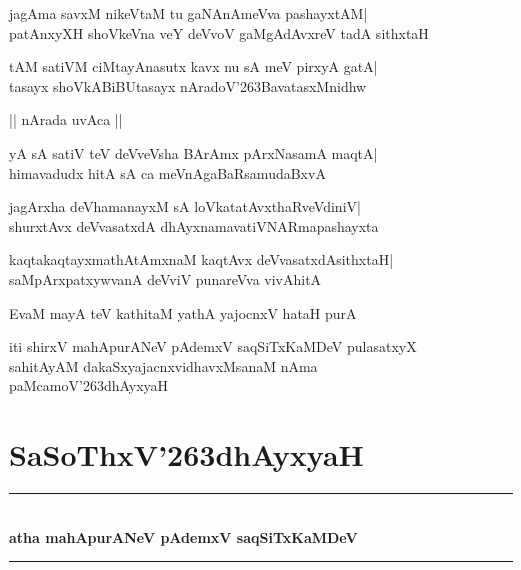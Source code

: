 \documentclass[twoside,12pt,openright]{book}
\def\S{\char'263}
\newcounter{shloka}[chapter]
\begin{document}
\begin{shloka}%
jagAma savxM nikeVtaM tu gaNAnAmeVva pashayxtAM|\\
patAnxyXH shoVkeVna veY deVvoV gaMgAdAvxreV tadA sithxtaH
\end{shloka}

\begin{shloka}%
tAM satiVM ciMtayAnasutx kavx nu sA meV pirxyA gatA|\\
tasayx shoVkABiBUtasayx nAradoV\S BavatasxMnidhw
\end{shloka}

\begin{center}
|| nArada uvAca ||
\end{center}
\begin{shloka}%
yA sA satiV teV deVveVsha BArAmx pArxNasamA maqtA|\\
himavadudx hitA sA ca meVnAgaBaRsamudaBxvA
\end{shloka}

\begin{shloka}%
jagArxha deVhamanayxM sA loVkatatAvxthaRveVdiniV|\\
shurxtAvx deVvasatxdA dhAyxnamavatiVNARmapashayxta
\end{shloka}

\begin{shloka}%
kaqtakaqtayxmathAtAmxnaM kaqtAvx deVvasatxdAsithxtaH|\\
saMpArxpatxywvanA deVviV punareVva vivAhitA
\end{shloka}

\begin{shloka}%
EvaM mayA teV kathitaM yathA yajocnxV hataH purA
\end{shloka}

\begin{center}
 iti shirxV mahApurANeV pAdemxV saqSiTxKaMDeV pulasatxyX\\
 sahitAyAM dakaSxyajacnxvidhavxMsanaM nAma\\
 paMcamoV\S dhAyxyaH
\end{center}

\chapter{SaSoThxV\S dhAyxyaH}
\begin{center}
\rule{2cm}{1pt}\\[.5cm]
{\LARGE\bfseries atha mahApurANeV pAdemxV saqSiTxKaMDeV}\\[.3cm]
\rule{2cm}{1pt}\\
\end{center}
\end{document}
